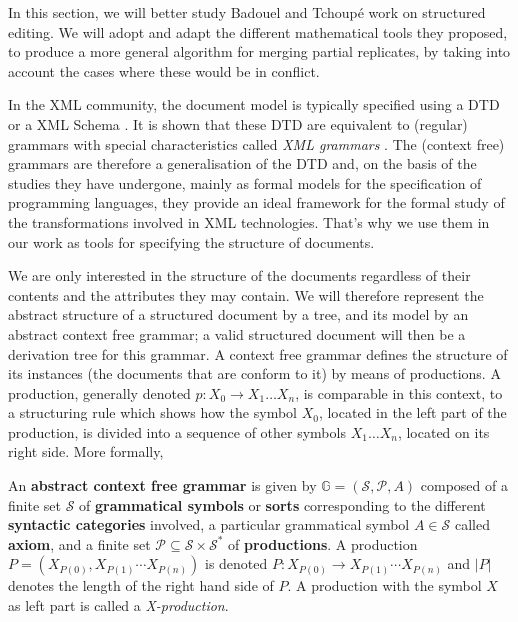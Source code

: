 
In this section, we will better study Badouel and Tchoup\'e work on structured editing. We will adopt and adapt the different mathematical tools they proposed, to produce a more general algorithm for merging partial replicates, by taking into account the cases where these would be in conflict.

\label{chap2:sec:structured-cooperative-editing-partial-rep}

\label{chap2:sec:structured-document-edition-conformity}

In the XML community, the document model is typically specified using a DTD or a XML Schema \cite{xml2000}. It is shown that these DTD are equivalent to (regular) grammars with special characteristics called   \textit{XML grammars} \cite{XMLG}. The (context free) grammars are therefore a generalisation of the DTD and, on the basis of the studies they have undergone, mainly as formal models for the specification of programming languages, they provide an ideal framework for the formal study of the transformations involved in XML technologies. That's why we use them in our work as tools for specifying the structure of documents.

We are only interested in the structure of the documents regardless of their contents and the attributes they may contain.  
We will therefore represent the abstract structure of a structured document by a tree, and its model by an abstract context free grammar; a valid structured document will then be a derivation tree for this grammar. 
A context free grammar defines the structure of its instances (the documents that are conform to it) by means of productions. 
A production, generally denoted $p: X_0 \rightarrow X_1 \ldots X_n$, is comparable in this context, to a structuring rule which shows how the symbol $X_0$, located in the left part of the production, is divided into a sequence of other symbols $X_1 \ldots X_n$, located on its right side. More formally, 

\begin{definition}
An \textbf{abstract context free grammar} is given by $\mathbb{G}=\left(\mathcal{S},\mathcal{P},A\right)$
composed of a finite set $\mathcal{S}$ of \textbf{grammatical symbols} or \textbf{sorts} corresponding to the different \textbf{syntactic categories} involved, a particular grammatical symbol $A\in\mathcal{S}$ called \textbf{axiom}, and a finite set $\mathcal{P}\subseteq\mathcal{S}\times\mathcal{S}^{*}$ of \textbf{productions}. 
A production $P=\left(X_{P(0)},X_{P(1)}\cdots X_{P(n)}\right)$ is denoted $P:X_{P(0)}\rightarrow X_{P(1)}\cdots X_{P(n)}$ and $\left|P\right|$ 
denotes the length of the right hand side of $P$. A production with the symbol $X$ as left part is called a \textit{X-production}.
\end{definition}

